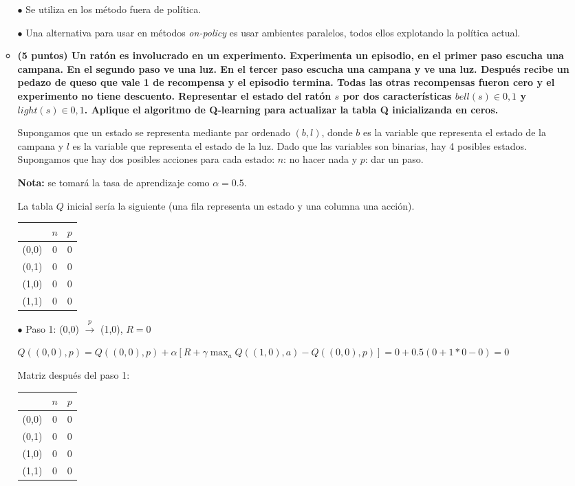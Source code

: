 \documentclass[a4paper,10pt]{article}
\begin{document}
\begin{enumerate}
\begin{itemize}
	$\bullet$ Se utiliza en los método fuera de política.
	
	$\bullet$ Una alternativa para usar en métodos \textit{on-policy} es usar ambientes paralelos, todos ellos explotando la política actual.
	
	\item \textbf{(5 puntos)  Un ratón es involucrado en un experimento. Experimenta un episodio, en el primer paso escucha una campana. En el segundo paso ve una luz. En el tercer paso escucha una campana y ve una luz. Después recibe un pedazo de queso que vale 1 de recompensa y el episodio termina. Todas las otras recompensas fueron cero y el experimento no tiene descuento. Representar el estado del ratón $s$ por dos características $bell(s)\in{0,1}$ y $light(s)\in{0,1}$. Aplique el algoritmo de Q-learning para actualizar la tabla Q inicializanda en ceros.}
	
	Supongamos que un estado se representa mediante par ordenado $(b,l)$, donde $b$ es la variable que representa el estado de la campana y $l$ es la variable que representa el estado de la luz. Dado que las variables son binarias, hay 4 posibles estados. Supongamos que hay dos posibles acciones para cada estado: $n$: no hacer nada y $p$: dar un paso.
	
	\textbf{Nota:} se tomará la tasa de aprendizaje como $\alpha = 0.5$.
	
	La tabla $Q$ inicial sería la siguiente (una fila representa un estado y una columna una acción).
	
	\begin{tabular}{|c|c|c|}
	\hline
	   & $n$ & $p$ \\ \hline
	(0,0) & 0 & 0 \\ \hline
	(0,1) & 0 & 0 \\ \hline
	(1,0) & 0 & 0 \\ \hline
	(1,1) & 0 & 0 \\ \hline
	\end{tabular}
	
	$\bullet$ Paso 1: (0,0) $\xrightarrow{p}$ (1,0), $R = 0$
	
	$Q((0,0), p) = Q((0,0), p) + \alpha [R + \gamma \max_a Q((1,0), a) - Q((0,0), p)] = 0 + 0.5(0 + 1*0 - 0) = 0$
	
	Matriz después del paso 1:
	
	\begin{tabular}{|c|c|c|}
	\hline
	   & $n$ & $p$ \\ \hline
	(0,0) & 0 & 0 \\ \hline
	(0,1) & 0 & 0 \\ \hline
	(1,0) & 0 & 0 \\ \hline
	(1,1) & 0 & 0 \\ \hline
	\end{tabular}
	

\end{itemize}
\end{enumerate}
\end{document}
